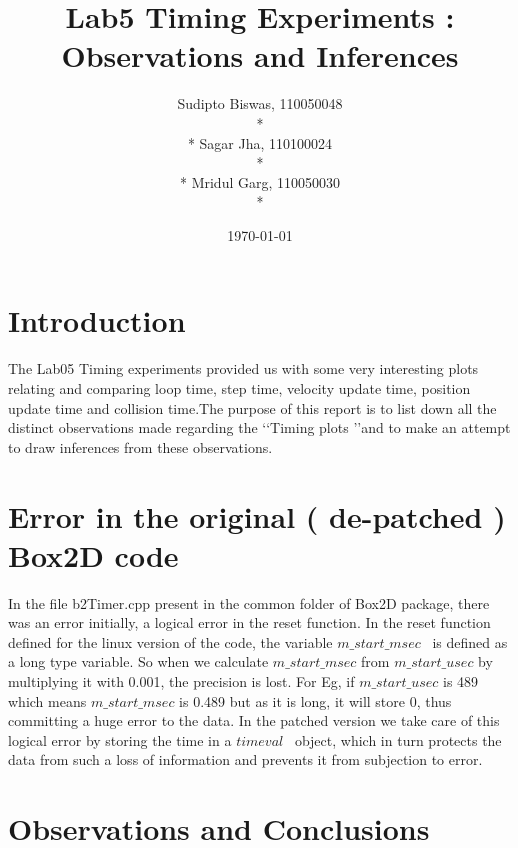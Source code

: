 \documentclass[10pt]{article}
\begin{document}
\title{Lab5 Timing Experiments : Observations and Inferences}
\author{ Sudipto Biswas, 110050048\\*
\\*
Sagar Jha, 110100024\\*
\\*
Mridul Garg, 110050030\\*
}
\date{\today}
\maketitle

\section{Introduction}
The Lab05 Timing experiments provided us with some very interesting plots relating and comparing loop time, step time, velocity update time, position update time and collision time.The purpose of this report is to list down all the distinct observations made regarding the \lq\lq Timing plots \rq\rq and to make an attempt to draw inferences from these observations.

\section{Error in the original ( de-patched ) Box2D code}
In the file b2Timer.cpp present in the common folder of Box2D package, there was an error initially, a logical error in the reset function. In the reset function defined for the linux version of the code, the variable $m\_start\_msec$ \ is defined as a long type variable. So when we calculate $m\_start\_msec$ from $m\_start\_usec$ by multiplying it with 0.001, the precision is lost. For Eg, if $m\_start\_usec$ is 489 which means $m\_start\_msec$ is 0.489 but as it is long, it will store 0, thus committing a huge error to the data. In the patched version we take care of this logical error by storing the time in a $timeval$ \ object, which in turn protects the data from such a loss of information and prevents it from subjection to error.

\section{Observations and Conclusions}
\end{document}
